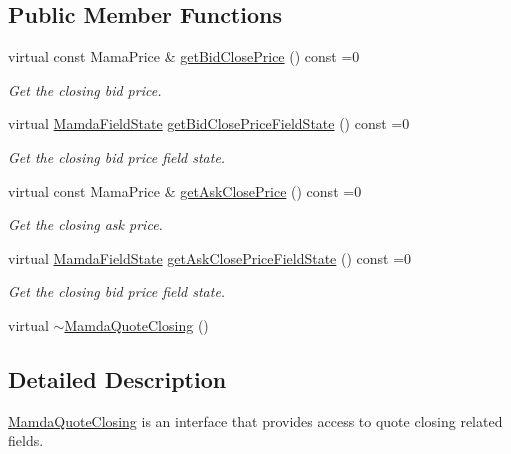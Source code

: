 \subsection*{Public Member Functions}
\begin{CompactItemize}
\item 
virtual const Mama\-Price \& \hyperlink{classWombat_1_1MamdaQuoteClosing_49a102e8abafb806713366521b9adeea}{get\-Bid\-Close\-Price} () const =0
\begin{CompactList}\small\item\em Get the closing bid price. \item\end{CompactList}\item 
virtual \hyperlink{namespaceWombat_93aac974f2ab713554fd12a1fa3b7d2a}{Mamda\-Field\-State} \hyperlink{classWombat_1_1MamdaQuoteClosing_b9a5522238b0f2c1d64a7192b28d4644}{get\-Bid\-Close\-Price\-Field\-State} () const =0
\begin{CompactList}\small\item\em Get the closing bid price field state. \item\end{CompactList}\item 
virtual const Mama\-Price \& \hyperlink{classWombat_1_1MamdaQuoteClosing_0db88ef67d6459e31b0568e9bbd44d59}{get\-Ask\-Close\-Price} () const =0
\begin{CompactList}\small\item\em Get the closing ask price. \item\end{CompactList}\item 
virtual \hyperlink{namespaceWombat_93aac974f2ab713554fd12a1fa3b7d2a}{Mamda\-Field\-State} \hyperlink{classWombat_1_1MamdaQuoteClosing_d6c65af52adcf386c114c5b757338072}{get\-Ask\-Close\-Price\-Field\-State} () const =0
\begin{CompactList}\small\item\em Get the closing bid price field state. \item\end{CompactList}\item 
virtual \hyperlink{classWombat_1_1MamdaQuoteClosing_9f5ff866d3758fe3abd59f561348964c}{$\sim$Mamda\-Quote\-Closing} ()
\end{CompactItemize}


\subsection{Detailed Description}
\hyperlink{classWombat_1_1MamdaQuoteClosing}{Mamda\-Quote\-Closing} is an interface that provides access to quote closing related fields. 



